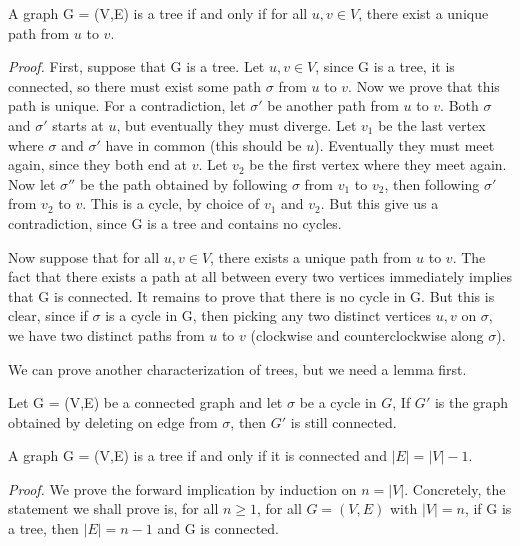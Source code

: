 \documentclass{tufte-handout}
\begin{document}
\begin{Proposition}
    A graph G = (V,E) is a tree if and only if for all \( u,v \in V \), there
    exist a unique path from \( u \) to \( v \).
\end{Proposition}

\textit{Proof.} First, suppose that G is a tree. Let \( u,v \in V \),
since G is a tree, it is connected, so there must exist some path \(\sigma\) from \( u \) to \( v \).
Now we prove that this path is unique. For a contradiction, let \(\sigma'\) be another path from \( u \) to \( v \).
Both \(\sigma\) and \(\sigma'\) starts at \( u \), but eventually they must diverge.
Let \(v_1\) be the last vertex where \(\sigma\) and \(\sigma'\) have in common (this should be \( u \)).
Eventually they must meet again, since they both end at \( v \). Let \( v_2 \) be the first vertex where they meet again.
Now let \(\sigma''\) be the path obtained by following \(\sigma\) from \( v_1 \) to \( v_2 \), then following
\(\sigma'\) from \( v_2 \) to \( v \). This is a cycle, by choice of \( v_1 \) and \( v_2 \).
But this give us a contradiction, since G is a tree and contains no cycles. 

Now suppose that for all \( u,v \in V \), there exists a unique path from \( u \) to \( v \).
The fact that there exists a path at all between every two vertices immediately implies that G is connected.
It remains to prove that there is no cycle in G. But this is clear, since if
\(\sigma\) is a cycle in G, then picking any two distinct vertices \( u,v \) on \(\sigma\),
we have two distinct paths from \( u \) to \( v \) (clockwise and counterclockwise along \(\sigma\)). \qedsymbol

We can prove another characterization of trees, but we need a lemma first.

\begin{Lemma}
    Let G = (V,E) be a connected graph and let \(\sigma\) be a cycle in \( G \),
    If \( G' \) is the graph obtained by deleting on edge from \(\sigma\), then \( G' \) is still connected.
\end{Lemma}

\begin{Lemma}
    A graph G = (V,E) is a tree if and only if it is connected and \(\left|E\right| = \left|V\right|-1\).
\end{Lemma}

\textit{Proof.} We prove the forward implication by induction on \( n = \left|V\right| \).
Concretely, the statement we shall prove is, for all \(n \geq 1\), for all \(G = (V,E)\) with \(\left|V\right| = n\),
if G is a tree, then \(\left|E\right| = n-1\) and G is connected.
\end{document}

